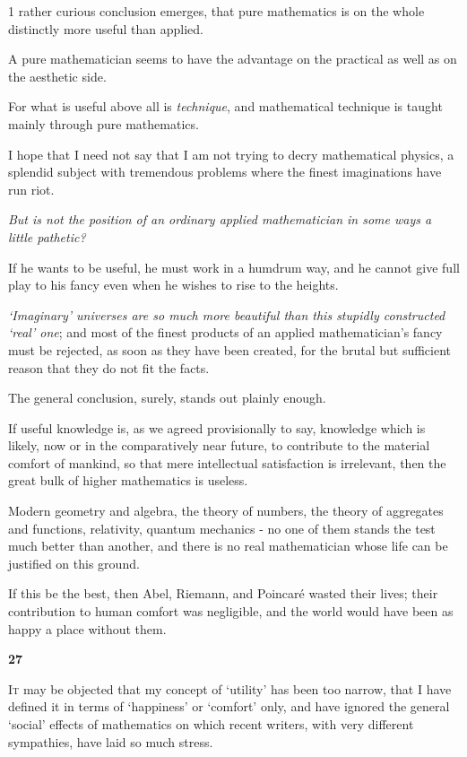 \documentclass{article}
\numberwithin{equation}{section}
\begin{document}
%
1 rather curious conclusion emerges, that pure mathematics is on the whole distinctly more useful than applied.

A pure mathematician seems to have the advantage on the practical as well as on the aesthetic side.

For what is useful above all is \textit{technique}, and mathematical technique is taught mainly through pure mathematics.

%
I hope that I need not say that I am not trying to decry mathematical physics, a splendid subject with tremendous problems where the finest imaginations have run riot.

\textit{But is not the position of an ordinary applied mathematician in some ways a little pathetic?}

If he wants to be useful, he must work in a humdrum way, and he cannot give full play to his fancy even when he wishes to rise to the heights.

\textit{`Imaginary' universes are so much more beautiful than this stupidly constructed `real' one}; and most of the finest products of an applied mathematician's fancy must be rejected, as soon as they have been created, for the brutal but sufficient reason that they do not fit the facts.

%
The general conclusion, surely, stands out plainly enough.

If useful knowledge is, as we agreed provisionally to say, knowledge which is likely, now or in the comparatively near future, to contribute to the material comfort of mankind, so that mere intellectual satisfaction is irrelevant, then the great bulk of higher mathematics is useless.

Modern geometry and algebra, the theory of numbers, the theory of aggregates and functions, relativity, quantum mechanics - no one of them stands the test much better than another, and there is no real mathematician whose life can be justified on this ground.

If this be the best, then Abel, Riemann, and Poincar\'e wasted their lives; their contribution to human comfort was negligible, and the world would have been as happy a place without them. 

\begin{center}
    \large\textbf{27}
\end{center}
\textsc{It} may be objected that my concept of `utility' has been too narrow, that I have defined it in terms of `happiness' or `comfort' only, and have ignored the general `social' effects of mathematics on which recent writers, with very different sympathies, have laid so much stress.
\end{document}
